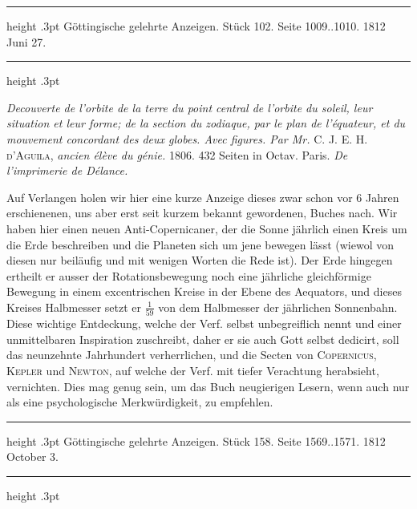 \par\bigskip
\hypertarget{native-546-middle}{}\label{native-546-middle}
\begin{center}
\parbox{.86\linewidth}{%
\centering\small
\hrule height .3pt\relax\vspace{2.5pt}
Göttingische gelehrte Anzeigen. Stück 102. Seite 1009..1010. 1812 Juni 27.\par
\vspace{2.5pt}\hrule height .3pt\relax
}
\end{center}
\par\nobreak\medskip

\emph{Decouverte de l'orbite de la terre du point central de l'orbite du soleil, leur situation et leur forme; de la section du zodiaque, par le plan de l'équateur, et du mouvement concordant des deux globes. Avec figures. Par Mr.} \textsc{C. J. E. H. d'Aguila}, \emph{ancien élève du génie.} 1806. 432 Seiten in Octav. Paris. \emph{De l'imprimerie de Délance.}

Auf Verlangen holen wir hier eine kurze Anzeige dieses zwar schon vor 6 Jahren erschienenen, uns aber erst seit kurzem bekannt gewordenen, Buches nach. Wir haben hier einen neuen Anti-Copernicaner, der die Sonne jährlich einen Kreis um die Erde beschreiben und die Planeten sich um jene bewegen lässt (wiewol von diesen nur beiläufig und mit wenigen Worten die Rede ist). Der Erde hingegen ertheilt er ausser der Rotationsbewegung noch eine jährliche gleichförmige Bewegung in einem excentrischen Kreise in der Ebene des Aequators, und dieses Kreises Halbmesser setzt er $\frac{1}{59}$ von dem Halbmesser der jährlichen Sonnenbahn. Diese wichtige Entdeckung, welche der Verf. selbst unbegreiflich nennt und einer unmittelbaren Inspiration zuschreibt, daher er sie auch Gott selbst dedicirt, soll das neunzehnte Jahrhundert verherrlichen, und die Secten von \textsc{Copernicus}, \textsc{Kepler} und \textsc{Newton}, auf welche der Verf. mit tiefer Verachtung herabsieht, vernichten. Dies mag genug sein, um das Buch neugierigen Lesern, wenn auch nur als eine psychologische Merkwürdigkeit, zu empfehlen.

\par\bigskip
\hypertarget{native-546-lower}{}\label{native-546-lower}
\begin{center}
\parbox{.86\linewidth}{%
\centering\small
\hrule height .3pt\relax\vspace{2.5pt}
Göttingische gelehrte Anzeigen. Stück 158. Seite 1569..1571. 1812 October 3.\par
\vspace{2.5pt}\hrule height .3pt\relax
}
\end{center}
\par\nobreak\medskip

